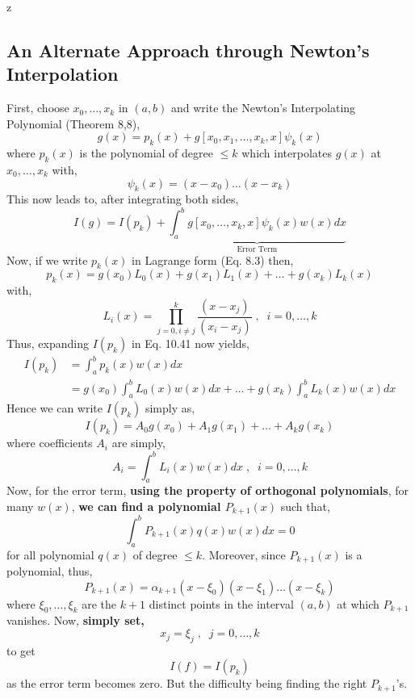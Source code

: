 z\documentclass[a4paper,12pt,twoside]{book}
\newcommand{\nll}[0]{\newline\newline}
\begin{document}
\subsection{An Alternate Approach through Newton's Interpolation}
First, choose $x_0,\dots, x_k$ in $(a,b)$ and write the Newton's Interpolating Polynomial (Theorem 8,8),
\[ g(x) = p_k(x) + g[x_0,x_1,\dots,x_k,x]\psi_k(x) \]
where $p_k(x)$ is the polynomial of degree $\le k$ which interpolates $g(x)$ at $x_0,\dots,x_k$ with,
\[\psi_k(x) = (x-x_0)\dots(x-x_k)\]
This now leads to, after integrating both sides,
\begin{equation}
    I(g) = I(p_k) + \underbrace{\int_a^bg[x_0,\dots,x_k,x]\psi_k(x)w(x)dx}_{\text{Error Term}}
\end{equation}
Now, if we write $p_k(x)$ in Lagrange form (Eq. 8.3) then,
\[ p_k(x) = g(x_0)L_0(x) + g(x_1)L_1(x) + \dots + g(x_k)L_k(x) \]
with,
\[L_i(x) = \prod_{j=0,i\neq j}^k\frac{(x-x_j)}{(x_i-x_j)}\;,\;\;i=0,\dots,k\]
Thus, expanding $I(p_k)$ in Eq. 10.41 now yields,
\begin{equation*}
\begin{split}
    I(p_k) &= \int_a^b p_k(x)w(x)dx\\
    &= g(x_0)\int_a^b L_0(x)w(x)dx + \dots + g(x_k)\int_a^bL_k(x)w(x)dx
\end{split}
\end{equation*}
Hence we can write $I(p_k)$ simply as,
\begin{equation}
    I(p_k) =A_0g(x_0) + A_1g(x_1) + \dots + A_kg(x_k)
\end{equation}
where coefficients $A_i$ are simply,
\begin{equation}
    A_i = \int_a^b L_i(x)w(x)dx\;,\;\;i=0,\dots,k 
\end{equation}
Now, for the error term, \textbf{using the property of orthogonal polynomials}, for many $w(x)$, \textbf{we can find a polynomial $P_{k+1}(x)$} such that,
\begin{equation}
    \int_a^b P_{k+1} (x)q(x)w(x)dx = 0
\end{equation}
for all polynomial $q(x)$ of degree $\le k$. Moreover, since $P_{k+1}(x)$ is a polynomial, thus,
\[P_{k+1}(x) = \alpha_{k+1}(x-\xi_0)(x-\xi_1)\dots(x-\xi_k)\]
where $\xi_0,\dots,\xi_k$ are the $k+1$ distinct points in the interval $(a,b)$ at which $P_{k+1}$ vanishes.
\nll
Now, \textbf{simply set,}
\begin{equation}
    x_j = \xi_j\;,\;\;j=0,\dots,k
\end{equation}
to get 
\[I(f) = I(p_k)\]
as the error term becomes zero. But the difficulty being finding the right $P_{k+1}$'s.
\end{document}
